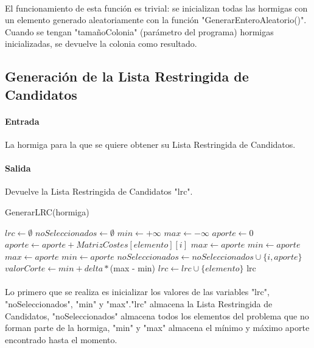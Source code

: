 	\paragraph{}El funcionamiento de esta función es trivial: se inicializan todas las hormigas con un elemento generado aleatoriamente con la función "GenerarEnteroAleatorio()". Cuando se tengan "tamañoColonia" (parámetro del programa) hormigas inicializadas, se devuelve la colonia como resultado.
	
	\subsection{Generación de la Lista Restringida de Candidatos}
	
	\paragraph{Entrada}La hormiga para la que se quiere obtener su Lista Restringida de Candidatos.
	
	\paragraph{Salida}Devuelve la Lista Restringida de Candidatos "lrc".
	
	\begin{algorithm}[H]
		\caption{GenerarLRC(hormiga)}
		\begin{algorithmic}
			\STATE$lrc \leftarrow \emptyset$
			\STATE$noSeleccionados \leftarrow \emptyset$
			\STATE$min \leftarrow +\infty$
			\STATE$max \leftarrow -\infty$
			\STATE $aporte \leftarrow 0$
			\STATE$aporte \leftarrow aporte + MatrizCostes[elemento][i]$
			\ENDFOR
			\STATE$max \leftarrow aporte$
			\STATE$min \leftarrow aporte$
			\ENDIF
			\STATE$max \leftarrow aporte$
			\STATE$min \leftarrow aporte$
			\ENDIF
			\STATE$noSeleccionados\leftarrow noSeleccionados \cup \{i,aporte\}$
			\ENDIF
			\ENDFOR
			\STATE$valorCorte \leftarrow min + delta *$(max - min)
			\STATE$lrc \leftarrow lrc \cup {\{elemento\}}$
			\ENDIF
			\ENDFOR
			\RETURN lrc
		\end{algorithmic}
	\end{algorithm}

	\paragraph{}Lo primero que se realiza es inicializar los valores de las variables "lrc", "noSeleccionados", "min" y "max"."lrc" almacena la Lista Restringida de Candidatos, "noSeleccionados" almacena todos los elementos del problema que no forman parte de la hormiga, "min" y "max" almacena el mínimo y máximo aporte encontrado hasta el momento.
	
